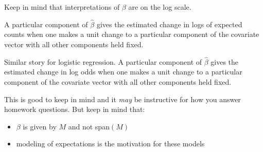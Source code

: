 \documentclass[
  ignorenonframetext,
]{beamer}
\providecommand{\tightlist}{%
  \setlength{\itemsep}{0pt}\setlength{\parskip}{0pt}}
\begin{document}
\begin{frame}{}
\protect\hypertarget{section-6}{}
Keep in mind that interpretations of \(\beta\) are on the log scale.

\vspace{12pt}

A particular component of \(\hat{\beta}\) gives the estimated change in
logs of expected counts when one makes a unit change to a particular
component of the covariate vector with all other components held fixed.

\vspace{12pt}

Similar story for logistic regression. A particular component of
\(\hat{\beta}\) gives the estimated change in log odds when one makes a
unit change to a particular component of the covariate vector with all
other components held fixed.

\vspace{12pt}

This is good to keep in mind and it \emph{may} be instructive for how
you answer homework questions. But keep in mind that:

\begin{itemize}
\tightlist
\item
  \(\beta\) is given by \(M\) and not span\((M)\)
\item
  modeling of expectations is the motivation for these models
\end{itemize}
\end{frame}
\end{document}
